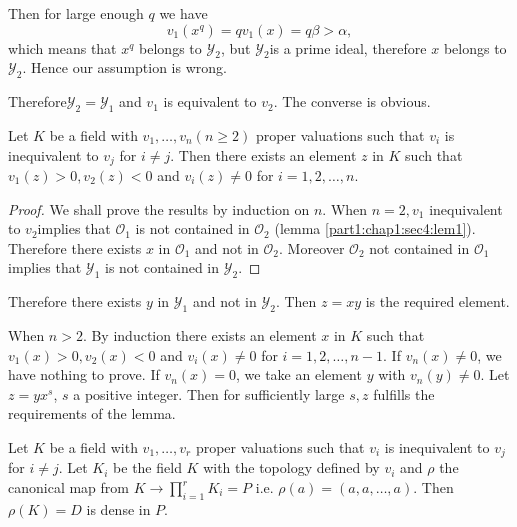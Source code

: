  Then for large enough $q$ we have 
 $$
 v_{1}(x^{q}) = qv_{1}(x) = q \beta > \alpha, 
 $$
 which means that $x^{q}$ belongs to $\mathscr{Y}_{2}$, but
 $\mathscr{Y}_{2}$is a prime ideal, therefore $x$ belongs to
 $\mathscr{Y}_{2}$. Hence our assumption is wrong. 
 
 Therefore\pageoriginale $\mathscr{Y}_{2} = \mathscr{Y}_{1}$ and $v_{1}$ is
 equivalent to $v_{2}$. The converse is obvious. 
 
\begin{Lemma}\label{part1:chap1:sec4:lem2}%
  Let $K$ be a field with $v_{1},\ldots, v_{n}(n \ge 2)$ proper
  valuations such that $v_{i}$ is inequivalent to $v_{j}$ for $i \neq
  j$. Then there exists an element $z$ in $K$ such that $v_{1} (z) >
  0, v_{2}(z)< 0$ and $v_{i}(z) \neq 0$ for $i = 1, 2, \ldots,  n$.   
\end{Lemma} 
 
\begin{proof}
   We shall prove the results by induction on $n$. When $n = 2, v_{1}$
   inequivalent to $v_{2}$implies that $\mathscr{O}_{1}$ is not
   contained in $\mathscr{O}_{2}$ (lemma
   \ref{part1:chap1:sec4:lem1}). Therefore there exists 
   $x$ in $\mathscr{O}_{1}$ and not in $\mathscr{O}_{2}$. Moreover
   $\mathscr{O}_{2}$ not contained in $\mathscr{O}_{1}$ implies that
   $\mathscr{Y}_{1}$ is not contained in $\mathscr{Y}_{2}$.   
\end{proof} 
 
 Therefore there exists $y$ in $\mathscr{Y}_{1}$ and not in
 $\mathscr{Y}_{2}$. Then $z = xy$ is the required element.  
 
 When $n > 2$. By induction there exists an element $x$ in $K$ such
 that $v_{1}(x) > 0, v_{2}(x) < 0$ and $v_{i}(x) \neq 0$ for $i = 1,2,
 \ldots, n-1$. 
 If $v_{n}(x) \neq 0$, we have nothing to prove. If $v_{n}(x) = 0$, we
 take an element $y$ with $v_{n}(y) \neq 0$. Let $z = y x^{s}$, $s$ a
 positive integer. Then for sufficiently large $s,z$ fulfills the
 requirements of the lemma. 
 
\begin{theorem}\label{part1:chap1:sec4:thm1}
  Let $K$ be a field with $v_{1}, \ldots,  v_{r}$ proper valuations
  such that $v_{i}$ is inequivalent to $v_{j}$ for $i \neq j$. Let
  $K_{i}$ be the field $K$ with the topology defined by $v_{i}$ and
  $\rho$ the canonical map from $K \to  \prod\limits^{r}_{i=1} K_{i} = P$
  i.e. $\rho (a) = (a, a,\ldots,a)$. Then $\rho(K) = D$ is dense in $P$.  
\end{theorem}  


